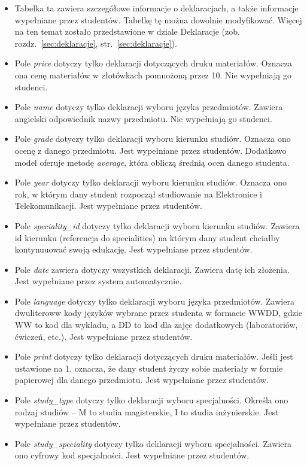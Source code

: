 \documentclass[a4paper,12pt,oneside]{report}
\begin{document}
\begin{itemize}
  \item Tabelka ta zawiera szczegółowe informacje o deklaracjach, a także informacje wypełniane przez studentów. Tabelkę tę można dowolnie modyfikować. Więcej na ten temat zostało przedstawione w dziale Deklaracje (zob. rozdz.~\ref{sec:deklaracje}, str.~\ref{sec:deklaracje}).
  \item Pole \emph{price} dotyczy tylko deklaracji dotyczących druku materiałów. Oznacza ona cenę materiałów w złotówkach pomnożoną przez 10. Nie wypełniają go studenci.
  \item Pole \emph{name} dotyczy tylko deklaracji wyboru języka przedmiotów. Zawiera angielski odpowiednik nazwy przedmiotu. Nie wypełniają go studenci.
  \item Pole \emph{grade} dotyczy tylko deklaracji wyboru kierunku studiów. Oznacza ono ocenę z danego przedmiotu. Jest wypełniane przez studentów. Dodatkowo model oferuje metodę \emph{average}, która obliczą średnią ocen danego studenta.
  \item Pole \emph{year} dotyczy tylko deklaracji wyboru kierunku studiów. Oznacza ono rok, w którym dany student rozpoczął studiowanie na Elektronice i Telekomunikacji. Jest wypełniane przez studentów.
  \item Pole \emph{speciality\_id} dotyczy tylko deklaracji wyboru kierunku studiów. Zawiera id kierunku (referencja do specialities) na którym dany student chciałby kontynuuować swoją edukację. Jest wypełniane przez studentów.
  \item Pole \emph{date} zawiera dotyczy wszystkich deklaracji. Zawiera datę ich złożenia. Jest wypełniane przez system automatycznie.
  \item Pole \emph{language} dotyczy tylko deklaracji wyboru języka przedmiotów. Zawiera dwuliteroww kody języków wybrane przez studenta w formacie WWDD, gdzie WW to kod dla wykładu, a DD to kod dla zajęc dodatkowych (laboratoriów, ćwiczeń, etc.). Jest wypełniane przez studentów.
  \item Pole \emph{print} dotyczy tylko deklaracji dotyczących druku materiałów. Jeśli jest ustawione na 1, oznacza, że dany student życzy sobie materiały w formie papierowej dla danego przedmiotu. Jest wypełniane przez studentów.
  \item Pole \emph{study\_type} dotyczy tylko deklaracji wyboru specjalności. Określa ono rodzaj studiów -- M to studia magisterskie, I to studia inżynierskie. Jest wypełniane przez studentów.
  \item Pole \emph{study\_speciality} dotyczy tylko deklaracji wyboru specjalności. Zawiera ono cyfrowy kod specjalności. Jest wypełniane przez studentów.
\end{itemize}
\end{document}
